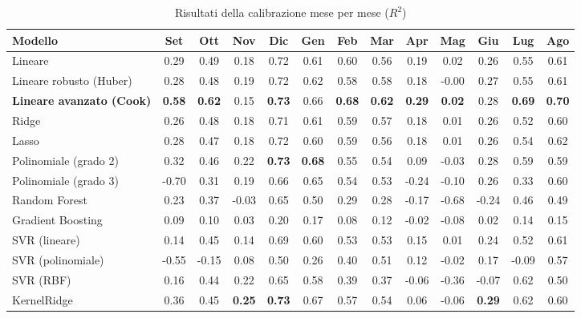 \begin{table}[H]
    \tiny
    \centering
    \setlength{\tabcolsep}{4pt}
    \def\arraystretch{1.5}
    \begin{tabular}{|l|c|c|c|c|c|c|c|c|c|c|c|c|}
    \hline
        \textbf{Modello} & \textbf{Set} & \textbf{Ott} & \textbf{Nov} & \textbf{Dic} & \textbf{Gen} & \textbf{Feb} & \textbf{Mar} & \textbf{Apr} & \textbf{Mag} & \textbf{Giu} & \textbf{Lug} & \textbf{Ago} \\ \hline
        Lineare & 0.29 & 0.49 & 0.18 & 0.72 & 0.61 & 0.60 & 0.56 & 0.19 & 0.02 & 0.26 & 0.55 & 0.61 \\ \hline
        Lineare robusto (Huber) & 0.28 & 0.48 & 0.19 & 0.72 & 0.62 & 0.58 & 0.58 & 0.18 & -0.00 & 0.27 & 0.55 & 0.61 \\ \hline
        \textbf{Lineare avanzato (Cook)} & \textbf{0.58} & \textbf{0.62} & 0.15 & \textbf{0.73} & 0.66 & \textbf{0.68} & \textbf{0.62} & \textbf{0.29} & \textbf{0.02} & 0.28 & \textbf{0.69} & \textbf{0.70} \\ \hline
        Ridge & 0.26 & 0.48 & 0.18 & 0.71 & 0.61 & 0.59 & 0.57 & 0.18 & 0.01 & 0.26 & 0.52 & 0.60 \\ \hline
        Lasso & 0.28 & 0.47 & 0.18 & 0.72 & 0.60 & 0.59 & 0.56 & 0.18 & 0.01 & 0.26 & 0.54 & 0.62 \\ \hline
        Polinomiale (grado 2) & 0.32 & 0.46 & 0.22 & \textbf{0.73} & \textbf{0.68} & 0.55 & 0.54 & 0.09 & -0.03 & 0.28 & 0.59 & 0.59 \\ \hline
        Polinomiale (grado 3) & -0.70 & 0.31 & 0.19 & 0.66 & 0.65 & 0.54 & 0.53 & -0.24 & -0.10 & 0.26 & 0.33 & 0.60 \\ \hline
        Random Forest & 0.23 & 0.37 & -0.03 & 0.65 & 0.50 & 0.29 & 0.28 & -0.17 & -0.68 & -0.24 & 0.46 & 0.49 \\ \hline
        Gradient Boosting & 0.09 & 0.10 & 0.03 & 0.20 & 0.17 & 0.08 & 0.12 & -0.02 & -0.08 & 0.02 & 0.14 & 0.15 \\ \hline
        SVR (lineare) & 0.14 & 0.45 & 0.14 & 0.69 & 0.60 & 0.53 & 0.53 & 0.15 & 0.01 & 0.24 & 0.52 & 0.61 \\ \hline
        SVR (polinomiale) & -0.55 & -0.15 & 0.08 & 0.50 & 0.26 & 0.40 & 0.51 & 0.12 & -0.02 & 0.17 & -0.09 & 0.57 \\ \hline
        SVR (RBF) & 0.16 & 0.44 & 0.22 & 0.65 & 0.58 & 0.39 & 0.37 & -0.06 & -0.36 & -0.07 & 0.62 & 0.50 \\ \hline
        KernelRidge & 0.36 & 0.45 & \textbf{0.25} & \textbf{0.73} & 0.67 & 0.57 & 0.54 & 0.06 & -0.06 & \textbf{0.29} & 0.62 & 0.60 \\ \hline
    \end{tabular}
    \caption{Risultati della calibrazione  mese per mese ($R^2$)}
    \label{fig:risultati-pm2.5-mese}
\end{table}

